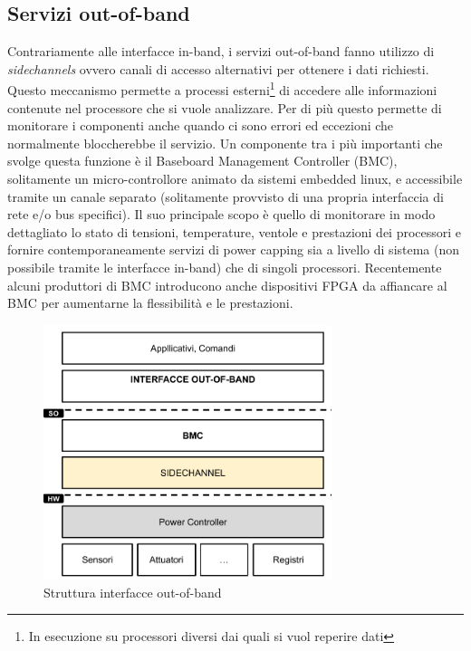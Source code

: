 \subsection{Servizi out-of-band}
Contrariamente alle interfacce in-band, i servizi out-of-band fanno utilizzo di \emph{sidechannels} ovvero canali di accesso alternativi per ottenere i dati richiesti. Questo meccanismo permette a processi esterni\footnote{In esecuzione su processori diversi dai quali si vuol reperire dati} di accedere alle informazioni contenute nel processore che si vuole analizzare. Per di più questo permette di monitorare i componenti anche quando ci sono errori ed eccezioni che normalmente bloccherebbe il servizio. Un componente tra i più importanti che svolge questa funzione è il Baseboard Management Controller (BMC), solitamente un micro-controllore animato da sistemi embedded linux, e accessibile tramite un canale separato (solitamente provvisto di una propria interfaccia di rete e/o bus specifici). Il suo principale scopo è quello di monitorare in modo dettagliato lo stato di tensioni, temperature, ventole e prestazioni dei processori e fornire contemporaneamente servizi di power capping sia a livello di sistema (non possibile tramite le interfacce in-band) che di singoli processori.
Recentemente alcuni produttori di BMC introducono anche dispositivi FPGA da affiancare al BMC per aumentarne la flessibilità e le prestazioni.
\begin{figure}[H]
    \centering
    \includegraphics[width=0.75\textwidth]{img/out-of-band.png}
    \caption{Struttura interfacce out-of-band} 
    \label{fig:inband}
\end{figure}


